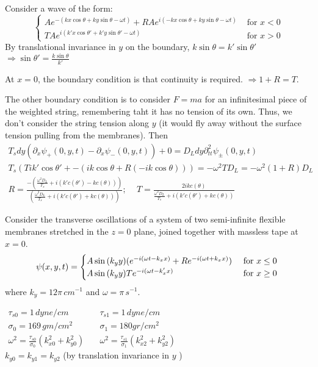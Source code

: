 \documentclass[twoside,10pt]{amsart}
\newcommand{\problemhead}[1]
  {\smallskip
   \noindent{\large\bf Problem #1.}
   \smallskip}
\begin{document}
Consider a wave of the form: 
\[
\begin{cases}
  Ae^{ - (kx \cos{\theta} + ky \sin{\theta} - \omega t ) } + RA e^{ i (-kx \cos{\theta} + ky \sin{\theta} - \omega t) } & \text{ for } x < 0 \\
  TA e^{ i (k' x \cos{ \theta'} + k'y \sin{ \theta'} - \omega t) } & \text{ for } x > 0 
\end{cases}
\]
By translational invariance in $y$ on the boundary, $k\sin{\theta} = k' \sin{\theta'}$ $\Longrightarrow \boxed{ \sin{\theta'} = \frac{ k \sin{\theta}}{k'}}$

At $x=0$, the boundary condition is that continuity is required.  $\Longrightarrow 1 + R =T$.  

The other boundary condition is to consider $F=ma$ for an infinitesimal piece of the weighted string, remembering taht it has no tension of its own.  Thus, we don't consider the string tension along $y$ (it would fly away without the surface tension pulling from the membranes).  Then
\[
\begin{gathered}
  T_s dy ( \partial_x \psi_+(0,y,t) - \partial_x \psi_-(0,y,t) ) + 0 = D_L dy \partial_{tt}^2 \psi_{\pm}(0,y,t) \\
  T_s \left( T i k' \cos{\theta'}  +  -(ik\cos{\theta} + R(-ik \cos{\theta}) ) \right) = - \omega^2 TD_L= - \omega^2 (1+R)D_L \\
\boxed{ R = \frac{ - \left( \frac{ \omega^2 D_L}{T_s} + i (k' c(\theta') - k c(\theta) ) \right) }{ \left( \frac{ \omega^2 D_L}{T_s} + i (k'c(\theta') + kc(\theta) ) \right) }; \quad \, T = \frac{ 2 i k c(\theta)}{ \frac{ \omega^2 D_L}{T_s} + i (k'c(\theta') + kc(\theta) ) } }
\end{gathered}
\]

\problemhead{11.6} Consider the transverse oscillations of a system of two semi-infinite flexible membranes stretched in the $z=0$ plane, joined together with massless tape at $x=0$.  
\[
\psi(x,y,t) = \begin{cases} A\sin{ (k_y y)} (e^{-i (\omega t - k_x x) } + Re^{-i (\omega t+ k_x x) }) & \text{ for $ x\leq 0 $ } \\
A \sin{ (k_y y)} Te^{ - i (\omega t - k_x' x) } & \text{ for $x\geq 0$ }
\end{cases}
\]
where $k_y = 12 \pi \, cm^{-1}$ and $\omega = \pi \, s^{-1}$.  

$\begin{aligned}
  \tau_{s0} = 1 \, dyne/cm  \quad \quad \, & \tau_{s1} = 1 \, dyne/cm \\
  \sigma_{0} = 169 \, gm/cm^2  \quad \quad \, & \sigma_1 = 180 gr/cm^2 \\
  \omega^2 = \frac{ \tau_{s0}}{\sigma_0}(k_{x0}^2 + k_{y0}^2 )  \quad & \omega^2 = \frac{\tau_{s1}}{\sigma_1} (k_{x2}^2 + k_{y2}^2 ) 
\end{aligned}$ \\
$k_{y0} = k_{y1} = k_{y2}$ (by translation invariance in $y$ )
\end{document}
